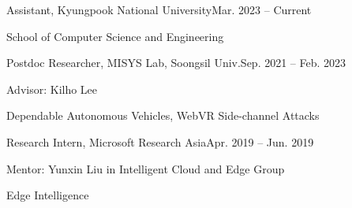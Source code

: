 \documentclass[11pt,letterpaper]{article}
\begin{document}
\begin{envtime}{Assistant, Kyungpook National University}{Mar. 2023 -- Current}
	\item School of Computer Science and Engineering
\end{envtime}
\begin{envtime}{Postdoc Researcher, MISYS Lab, Soongsil Univ.}{Sep. 2021 -- Feb. 2023}
	\item Advisor: Kilho Lee
	\item Dependable Autonomous Vehicles, WebVR Side-channel Attacks
\end{envtime}
\begin{envtime}[China]{Research Intern, Microsoft Research Asia}{Apr. 2019 -- Jun. 2019}
	\item Mentor:  Yunxin Liu in Intelligent Cloud and Edge Group
	\item Edge Intelligence
\end{envtime}



%
%

\end{document}
